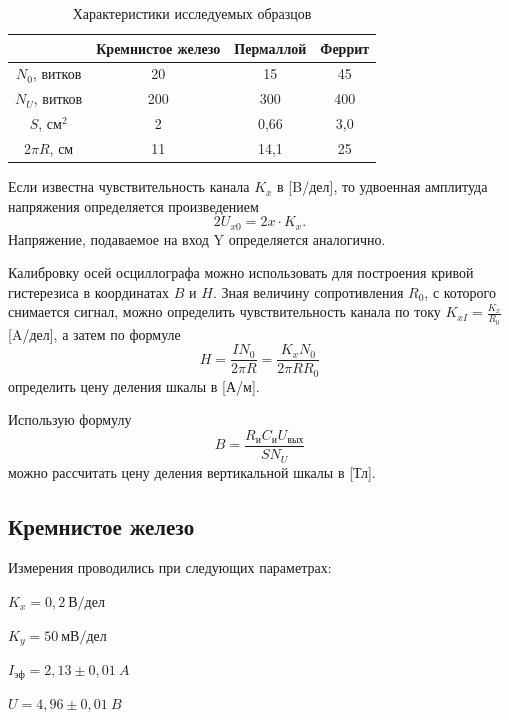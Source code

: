 \documentclass[a4paper, 12pt]{article}
\begin{document}
\begin{table}[h!]
\begin{center}
\begin{tabular}{|c|c|c|c|}
\hline 
 & Кремнистое железо & Пермаллой & Феррит \\ 
\hline 
$N_0$, витков & 20 & 15 & 45 \\ 
\hline 
$N_U$, витков & 200 & 300 & 400 \\ 
\hline 
$S$, $см^2$ & 2 & 0,66 & 3,0 \\ 
\hline 
$2\pi R$, см & 11 & 14,1 & 25 \\ 
\hline 
\end{tabular} 
\end{center}
\caption{Характеристики исследуемых образцов}
\label{tab1}
\end{table}

Если известна чувствительность канала $K_x$ в [B/дел], то удвоенная амплитуда напряжения определяется произведением $$2U_{x0} = 2x \cdot K_x.$$ Напряжение, подаваемое на вход Y определяется аналогично.

Калибровку осей осциллографа можно использовать для построения кривой гистерезиса в координатах $B$ и $H$. Зная величину сопротивления $R_0$, с которого снимается сигнал, можно определить чувствительность канала по току $K_{xI} = \frac{K_x}{R_0}$ [A/дел], а затем по формуле
\begin{equation}\label{eq:H(del)}
H = \frac{I N_0}{2 \pi R} = \frac{K_x N_0}{2 \pi R R_0}
\end{equation}
определить цену деления шкалы в [А/м].

Использую формулу
\begin{equation}\label{eq:B(del)}
B = \frac{R_и C_и U_{вых}}{S N_U}
\end{equation}
можно рассчитать цену деления вертикальной шкалы в [Тл].

\subsection{Кремнистое железо}

Измерения проводились при следующих параметрах:
\begin{description}
\item{} $K_x = 0,2~В/дел$
\item{} $K_y = 50~мВ/дел$
\item{} $I_{эф} = 2,13\pm0,01~A$
\item{} $U = 4,96\pm0,01~B$
\end{description}
\end{document}
